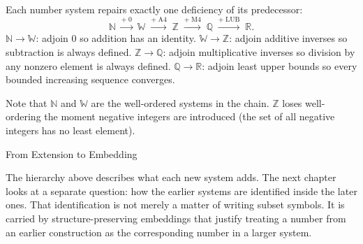 \begin{remark*}
Each number system repairs exactly one deficiency of its predecessor:
\[
\mathbb{N}
\;\xrightarrow{+\;0}\;
\mathbb{W}
\;\xrightarrow{+\;\mathrm{A4}}\;
\mathbb{Z}
\;\xrightarrow{+\;\mathrm{M4}}\;
\mathbb{Q}
\;\xrightarrow{+\;\mathrm{LUB}}\;
\mathbb{R}.
\]
$\mathbb{N} \to \mathbb{W}$: adjoin $0$ so addition has an identity.
$\mathbb{W} \to \mathbb{Z}$: adjoin additive inverses so subtraction is
always defined.
$\mathbb{Z} \to \mathbb{Q}$: adjoin multiplicative inverses so division by
any nonzero element is always defined.
$\mathbb{Q} \to \mathbb{R}$: adjoin least upper bounds so every bounded
increasing sequence converges.

Note that $\mathbb{N}$ and $\mathbb{W}$ are the well-ordered systems in the
chain.
$\mathbb{Z}$ loses well-ordering the moment negative integers are introduced
(the set of all negative integers has no least element).
\end{remark*}

\begin{topicbox}{From Extension to Embedding}
\begin{exposition}
The hierarchy above describes what each new system adds. The next chapter
looks at a separate question: how the earlier systems are identified inside
the later ones. That identification is not merely a matter of writing subset
symbols. It is carried by structure-preserving embeddings that justify
treating a number from an earlier construction as the corresponding number in
a larger system.
\end{exposition}
\end{topicbox}

